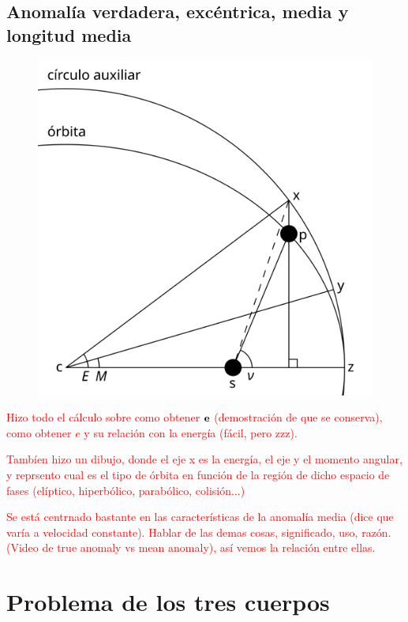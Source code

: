 \subsection{Anomalía verdadera, excéntrica, media y longitud media}

\begin{figure}[h!] \centering
    \includegraphics[width=0.4\linewidth]{Cuerpo/Ch_02/02_Anomalias.png}
    \caption{}
\end{figure}

\begin{Anotacion}
	\textcolor{red}{Hizo todo el cálculo sobre como obtener $\mathbf{e}$ (demostración de que se conserva), como obtener $e$ y su relación con la energía (fácil, pero zzz).}
\end{Anotacion}
\begin{Anotacion}
	\textcolor{red}{Tambíen hizo un dibujo, donde el eje x es la energía, el eje y el momento angular, y reprsento cual es el tipo de órbita en función de la región de dicho espacio de fases (elíptico, hiperbólico, parabólico, colisión...)}
\end{Anotacion}
\begin{Anotacion}
	\textcolor{red}{ Se está centrnado bastante en las características de la anomalía media (dice que varía a velocidad constante). Hablar de las demas cosas, significado, uso, razón. (Video de true anomaly vs mean anomaly), así vemos la relación entre ellas. }
\end{Anotacion}


\section{Problema de los tres cuerpos}

